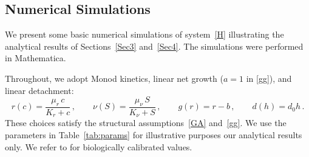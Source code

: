 \documentclass[reqno,11pt]{amsart}
\numberwithin{equation}{section}
\newcommand{\aequation}{\renewcommand{\theequation}{\mbox{A.\arabic{equation}}}}
\newcommand{\nequation}{\setcounter{equation}{0}}
\newcommand{\R}{\mathbb{R}}
\newcommand{\rd}{\mathrm{d}}
\begin{document}
\begin{appendix}

\nequation
\aequation
 
\section{Numerical Simulations}\label{AppN}
We present some basic numerical simulations of system~\eqref{H} illustrating the analytical results of Sections~\ref{Sec3} and~\ref{Sec4}. The simulations were performed in Mathematica.

Throughout, we adopt Monod kinetics, linear net growth ($a=1$ in \eqref{gg}), and linear detachment:
\begin{equation*}
r(c)=\frac{\mu_r \, c}{K_r+c}\,,\qquad
\nu(S)=\frac{\mu_\nu \, S}{K_\nu+S}\,,\qquad
g(r)=r-b\,,\qquad
d(h)=d_0 h\,.
\end{equation*}
These choices satisfy the structural assumptions~\eqref{GA} and~\eqref{gg}. We use the parameters in Table~\ref{tab:params} for illustrative purposes our analytical results only. We refer to \cite{MasicEberl12} for biologically calibrated values.
\\[0.3cm]


\end{appendix}
\end{document}
